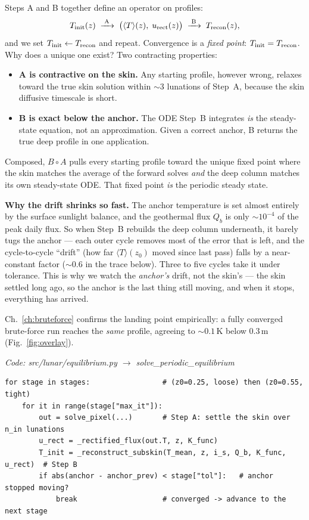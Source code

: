 \documentclass[11pt]{report}
\newcommand{\Tm}{\langle T\rangle}
\newcommand{\code}[1]{{\ttfamily\small #1}}
\begin{document}
Steps A and B together define an operator on profiles:
\[
T_{\rm init}(z)\;\xrightarrow{\;\text{A}\;}\;\bigl(\Tm(z),\;u_{\rm rect}(z)\bigr)
\;\xrightarrow{\;\text{B}\;}\;T_{\rm recon}(z),
\]
and we set $T_{\rm init}\leftarrow T_{\rm recon}$ and repeat. Convergence is a
\emph{fixed point}: $T_{\rm init}=T_{\rm recon}$. Why does a unique one exist?
Two contracting properties:
\begin{itemize}[leftmargin=1.4em,itemsep=2pt]
\item \textbf{A is contractive on the skin.} Any starting profile, however wrong,
  relaxes toward the true skin solution within $\sim$3 lunations of Step~A,
  because the skin diffusive timescale is short.
\item \textbf{B is exact below the anchor.} The ODE Step~B integrates \emph{is}
  the steady-state equation, not an approximation. Given a correct anchor, B
  returns the true deep profile in one application.
\end{itemize}
Composed, $B\circ A$ pulls every starting profile toward the unique fixed point
where the skin matches the average of the forward solves \emph{and} the deep
column matches its own steady-state ODE. That fixed point \emph{is} the periodic
steady state.

\begin{plain}
\textbf{Why the drift shrinks so fast.} The anchor temperature is set almost
entirely by the surface sunlight balance, and the geothermal flux $Q_b$ is only
${\sim}10^{-4}$ of the peak daily flux. So when Step~B rebuilds the deep column
underneath, it barely tugs the anchor --- each outer cycle removes most of the
error that is left, and the cycle-to-cycle ``drift'' (how far $\Tm(z_0)$ moved
since last pass) falls by a near-constant factor ($\sim$0.6 in the trace below).
Three to five cycles take it under tolerance. This is why we watch the
\emph{anchor's} drift, not the skin's --- the skin settled long ago, so the
anchor is the last thing still moving, and when it stops, everything has arrived.
\end{plain}

\noindent Ch.~\ref{ch:bruteforce} confirms the landing point empirically: a fully
converged brute-force run reaches the \emph{same} profile, agreeing to
${\sim}0.1$\,K below $0.3$\,m (Fig.~\ref{fig:overlay}).

{\small\color{dim}\textit{Code: \code{src/lunar/equilibrium.py} $\to$ \code{solve\_periodic\_equilibrium}}}
\begin{lstlisting}[style=py]
for stage in stages:                 # (z0=0.25, loose) then (z0=0.55, tight)
    for it in range(stage["max_it"]):
        out = solve_pixel(...)       # Step A: settle the skin over n_in lunations
        u_rect = _rectified_flux(out.T, z, K_func)
        T_init = _reconstruct_subskin(T_mean, z, i_s, Q_b, K_func, u_rect)  # Step B
        if abs(anchor - anchor_prev) < stage["tol"]:   # anchor stopped moving?
            break                    # converged -> advance to the next stage
\end{lstlisting}
\end{document}
